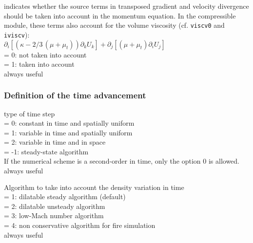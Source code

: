 {indicates whether the source terms in transposed gradient
and velocity divergence should be taken into account in the momentum
equation. In the compressible module, these terms also account for the volume
viscosity (cf. {\tt viscv0} and {\tt iviscv}):\\
$\partial_i \left[(\kappa -2/3\,(\mu+\mu_t))\partial_k U_k  \right]
 +     \partial_j \left[ (\mu+\mu_t)\partial_i U_j \right]$ \\
\hspace*{1.3cm}= 0: not taken into account\\
\hspace*{1.3cm}= 1: taken into account\\
always useful}


\subsubsection{Definition of the time advancement}

{type of time step\\
\hspace*{1.3cm}= 0: constant in time and spatially uniform\\
\hspace*{1.3cm}= 1: variable in time and spatially uniform\\
\hspace*{1.3cm}= 2: variable in time and in space\\
\hspace*{1.3cm}= -1: steady-state algorithm\\
If the numerical scheme is a second-order in time, only the option 0 is
allowed.\\
always useful}

{Algorithm to take into account the density variation in time\\
\hspace*{1.3cm}= 1: dilatable steady algorithm (default)\\
\hspace*{1.3cm}= 2: dilatable unsteady algorithm\\
\hspace*{1.3cm}= 3: low-Mach number algorithm\\
\hspace*{1.3cm}= 4: non conservative algorithm for fire simulation\\
always useful}

